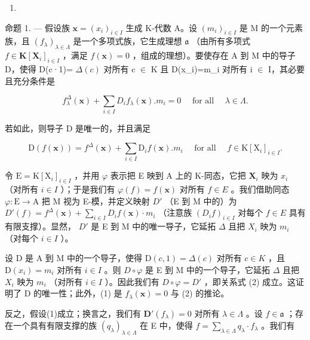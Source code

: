 \begin{enumerate}
\def\labelenumi{\Alph{enumi}.}
\setcounter{enumi}{12}
\tightlist
\item
\end{enumerate}

命题 1. --- 假设族 \(\mathbf{x} = (x_i)_{i \in I}\) 生成 K-代数 A。设 \((m_i)_{i \in I}\) 是 M 的一个元素族，且 \((f_\lambda)_{\lambda \in \Lambda}\) 是一个多项式族，它生成理想 \(\mathfrak{a}\) （由所有多项式 \(f \in \mathbf{K}[\mathbf{X}_i]_{i \in I}\) ，满足 \(f(\mathbf{x}) = 0\) ，组成的理想）。要使存在 A 到 M 中的导子 D，使得 D(c·1)= \(\Delta(c)\) 对所有 c \(\in\) K 且 D(x\_i)=m\_i 对所有 i \(\in\) I，其必要且充分条件是

\[
f _ {\lambda} ^ {\Delta} (\mathbf {x}) + \sum_ {i \in I} D _ {i} f _ {\lambda} (\mathbf {x}). m _ {i} = 0 \quad \text { for   all } \quad \lambda \in \Lambda .\tag{1}
\]

若如此，则导子 D 是唯一的，并且满足

\[
\mathrm{D} (f (\mathbf {x})) = f ^ {\Delta} (\mathbf {x}) + \sum_ {i \in I} \mathrm{D} _ {i} f (\mathbf {x}). m _ {i} \quad \text { for   all } \quad f \in \mathrm{K} [ \mathrm{X} _ {i} ] _ {i \in I}.\tag{2}
\]

令 \(\mathrm{E} = \mathrm{K}[\mathrm{X}_i]_{i \in I}\) ，并用 \(\varphi\) 表示把 E 映到 A 上的 K-同态，它把 \(\mathbf{X}_i\) 映为 \(x_i\) （对所有 \(i \in I\) ）；于是我们有 \(\varphi(f) = f(\mathbf{x})\) 对所有 \(f \in E\) 。我们借助同态 \(\varphi: \mathrm{E} \to \mathrm{A}\) 把 M 视为 E-模，并定义映射 \(D'\) （E 到 M 中的）为 \(D'(f) = f^{\Delta}(\mathbf{x}) + \sum_{i \in I} D_i f(\mathbf{x}) \cdot m_i\) （注意族 \((D_i f)_{i \in I}\) 对每个 \(f \in E\) 具有有限支撑）。显然， \(D'\) 是 E 到 M 中的唯一导子，它延拓 \(\Delta\) 且把 \(X_i\) 映为 \(m_i\) （对每个 \(i \in I\) ）。

设 D 是 A 到 M 中的一个导子，使得 \(\mathrm{D}(c,1)=\Delta(c)\) 对所有 \(c\in K\) ，且 \(\mathrm{D}(x_{i})=m_{i}\) 对所有 \(i\in I\) 。则 \(D\circ\varphi\) 是 E 到 M 中的一个导子，它延拓 \(\Delta\) 且把 \(X_{i}\) 映为 \(m_{i}\) （对所有 \(i\in I\) ）。因此我们有 \(D\circ\varphi=D'\) ，即关系式 (2) 成立。这证明了 D 的唯一性；此外，(1) 是 \(f_{\lambda}(\mathbf{x})=0\) 与 (2) 的推论。

反之，假设(1)成立；换言之，我们有 \(\mathbf{D}'(f_{\lambda}) = 0\) 对所有 \(\lambda \in \Lambda\) 。设 \(f \in \mathfrak{a}\) ；存在一个具有有限支撑的族 \((q_{\lambda})_{\lambda \in \Lambda}\) 在 E 中，使得 \(f = \sum_{\lambda \in \Lambda} q_{\lambda} \cdot f_{\lambda}\) 。我们有

